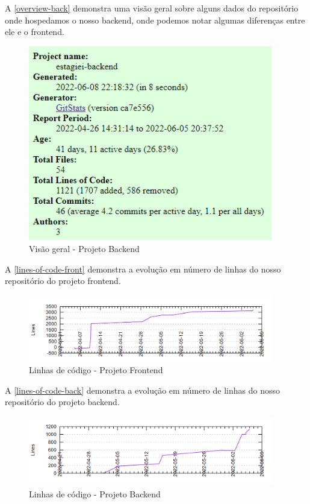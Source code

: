 A \autoref{overview-back} demonstra uma visão geral sobre alguns dados do repositório onde hospedamos o nosso backend, onde podemos notar algumas diferenças entre ele e o frontend.
\begin{figure}[H]
	\centering
	\caption{\label{overview-back}Visão geral - Projeto Backend}
	\includegraphics[width=0.95\textwidth]{../imagens/stats/overview-backend.png}
\end{figure}

A \autoref{lines-of-code-front} demonstra a evolução em número de linhas do nosso repositório do projeto frontend.
\begin{figure}[H]
	\centering
	\caption{\label{lines-of-code-front}Linhas de código - Projeto Frontend}
	\includegraphics[width=0.95\textwidth]{../imagens/stats/lines-of-code-frontend.png}
\end{figure}

A \autoref{lines-of-code-back} demonstra a evolução em número de linhas do nosso repositório do projeto backend.
\begin{figure}[H]
	\centering
	\caption{\label{lines-of-code-back}Linhas de código - Projeto Backend}
	\includegraphics[width=0.95\textwidth]{../imagens/stats/lines-of-code-backend.png}
\end{figure}

